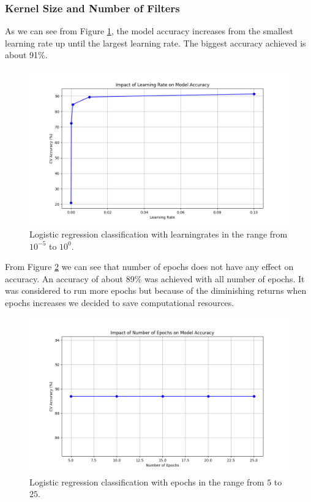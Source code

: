 \subsubsection{Kernel Size and Number of Filters}
\newpage
As we can see from Figure \ref{fig:LogRegLearningRate}, the model accuracy increases from the smallest learning rate up until the largest learning rate. The biggest accuracy achieved is about 91\%.

\begin{figure}[H]
    \centering
    \includegraphics[width=\textwidth]{results/logreg/learning_rate_study.png}
    \caption{Logistic regression classification with learningrates in the range from $10^{-5}$ to $10^0$.}
    \label{fig:LogRegLearningRate}
\end{figure}

From Figure \ref{fig:LogRegEpochs} we can see that number of epochs does not have any effect on accuracy. An accuracy of about 89\% was achieved with all number of epochs. It was considered to run more epochs but because of the diminishing returns when epochs increases we decided to save computational resources. 

\begin{figure}[H]
    \centering
    \includegraphics[width=\textwidth]{results/logreg/number_of_epochs_study.png}
    \caption{Logistic regression classification with epochs in the range from $5$ to $25$.}
    \label{fig:LogRegEpochs}
\end{figure}

